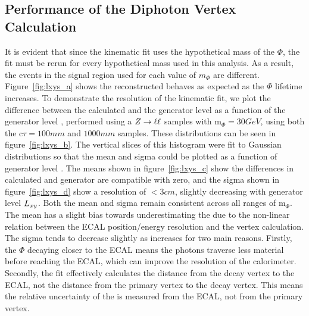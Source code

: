 \subsection{Performance of the Diphoton Vertex Calculation}\label{sec:ana_vertex_results}
It is evident that since the kinematic fit uses the hypothetical mass of the $\Phi$, the fit must be rerun for every hypothetical mass used in this analysis. As a result, the events in the signal region used for each value of $m_\Phi$ are different. Figure~\ref{fig:lxys_a} shows the reconstructed \lxy behaves as expected as the $\Phi$ lifetime increases. To demonstrate the resolution of the kinematic fit, we plot the difference between the calculated \lxy and the generator level \lxy as a function of the generator level \lxy, performed using a $Z\to\ell\ell$ samples with m$_\Phi=30\unit{GeV}$, using both the c$\tau=100\unit{mm}$ and $1000\unit{mm}$ samples. These distributions can be seen in figure~\ref{fig:lxys_b}. The vertical slices of this histogram were fit to Gaussian distributions so that the mean and sigma could be plotted as a function of generator level \lxy. The means shown in figure~\ref{fig:lxys_c} show the differences in calculated and generator \lxy are compatible with zero, and the sigma shown in figure~\ref{fig:lxys_d} show a resolution of $<3\unit{cm}$, slightly decreasing with generator level $L_{xy}$. Both the mean and sigma remain consistent across all ranges of m$_\Phi$. The mean has a slight bias towards underestimating the \lxy due to the non-linear relation between the ECAL position/energy resolution and the vertex calculation. The sigma tends to decrease slightly as \lxy increases for two main reasons. Firstly, the $\Phi$ decaying closer to the ECAL means the photons traverse less material before reaching the ECAL, which can improve the resolution of the calorimeter. Secondly, the fit effectively calculates the distance from the decay vertex to the ECAL, not the distance from the primary vertex to the decay vertex. This means the relative uncertainty of the \lxy is measured from the ECAL, not from the primary vertex.

